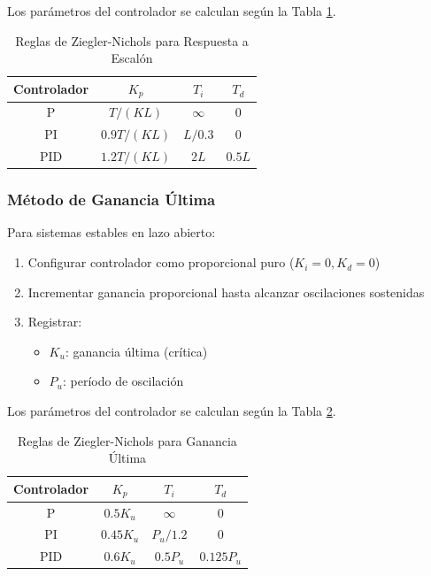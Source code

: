 \documentclass[conference]{IEEEtran}
\begin{document}
Los parámetros del controlador se calculan según la Tabla \ref{tab:zn_escalon}.

\begin{table}[htbp]
\centering
\caption{Reglas de Ziegler-Nichols para Respuesta a Escalón}
\label{tab:zn_escalon}
\begin{tabular}{cccc}
\toprule
\textbf{Controlador} & $K_p$ & $T_i$ & $T_d$ \\
\midrule
P & $T/(KL)$ & $\infty$ & 0 \\
PI & $0.9T/(KL)$ & $L/0.3$ & 0 \\
PID & $1.2T/(KL)$ & $2L$ & $0.5L$ \\
\bottomrule
\end{tabular}
\end{table}

\subsubsection{Método de Ganancia Última}

Para sistemas estables en lazo abierto:

\begin{enumerate}
\item Configurar controlador como proporcional puro ($K_i = 0, K_d = 0$)
\item Incrementar ganancia proporcional hasta alcanzar oscilaciones sostenidas
\item Registrar:
\begin{itemize}
\item $K_u$: ganancia última (crítica)
\item $P_u$: período de oscilación
\end{itemize}
\end{enumerate}

Los parámetros del controlador se calculan según la Tabla \ref{tab:zn_ganancia}.

\begin{table}[htbp]
\centering
\caption{Reglas de Ziegler-Nichols para Ganancia Última}
\label{tab:zn_ganancia}
\begin{tabular}{cccc}
\toprule
\textbf{Controlador} & $K_p$ & $T_i$ & $T_d$ \\
\midrule
P & $0.5K_u$ & $\infty$ & 0 \\
PI & $0.45K_u$ & $P_u/1.2$ & 0 \\
PID & $0.6K_u$ & $0.5P_u$ & $0.125P_u$ \\
\bottomrule
\end{tabular}
\end{table}
\end{document}
